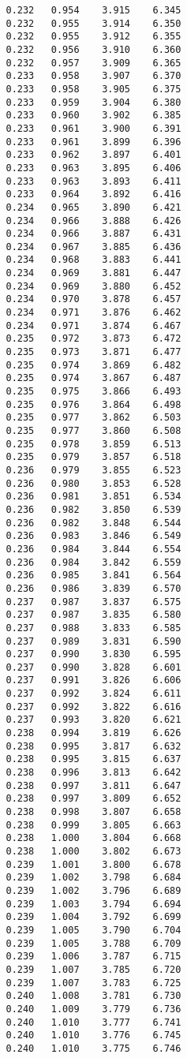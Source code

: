 \begin{verbatim}
   0.232   0.954    3.915    6.345
   0.232   0.955    3.914    6.350
   0.232   0.955    3.912    6.355
   0.232   0.956    3.910    6.360
   0.232   0.957    3.909    6.365
   0.233   0.958    3.907    6.370
   0.233   0.958    3.905    6.375
   0.233   0.959    3.904    6.380
   0.233   0.960    3.902    6.385
   0.233   0.961    3.900    6.391
   0.233   0.961    3.899    6.396
   0.233   0.962    3.897    6.401
   0.233   0.963    3.895    6.406
   0.233   0.963    3.893    6.411
   0.233   0.964    3.892    6.416
   0.234   0.965    3.890    6.421
   0.234   0.966    3.888    6.426
   0.234   0.966    3.887    6.431
   0.234   0.967    3.885    6.436
   0.234   0.968    3.883    6.441
   0.234   0.969    3.881    6.447
   0.234   0.969    3.880    6.452
   0.234   0.970    3.878    6.457
   0.234   0.971    3.876    6.462
   0.234   0.971    3.874    6.467
   0.235   0.972    3.873    6.472
   0.235   0.973    3.871    6.477
   0.235   0.974    3.869    6.482
   0.235   0.974    3.867    6.487
   0.235   0.975    3.866    6.493
   0.235   0.976    3.864    6.498
   0.235   0.977    3.862    6.503
   0.235   0.977    3.860    6.508
   0.235   0.978    3.859    6.513
   0.235   0.979    3.857    6.518
   0.236   0.979    3.855    6.523
   0.236   0.980    3.853    6.528
   0.236   0.981    3.851    6.534
   0.236   0.982    3.850    6.539
   0.236   0.982    3.848    6.544
   0.236   0.983    3.846    6.549
   0.236   0.984    3.844    6.554
   0.236   0.984    3.842    6.559
   0.236   0.985    3.841    6.564
   0.236   0.986    3.839    6.570
   0.237   0.987    3.837    6.575
   0.237   0.987    3.835    6.580
   0.237   0.988    3.833    6.585
   0.237   0.989    3.831    6.590
   0.237   0.990    3.830    6.595
   0.237   0.990    3.828    6.601
   0.237   0.991    3.826    6.606
   0.237   0.992    3.824    6.611
   0.237   0.992    3.822    6.616
   0.237   0.993    3.820    6.621
   0.238   0.994    3.819    6.626
   0.238   0.995    3.817    6.632
   0.238   0.995    3.815    6.637
   0.238   0.996    3.813    6.642
   0.238   0.997    3.811    6.647
   0.238   0.997    3.809    6.652
   0.238   0.998    3.807    6.658
   0.238   0.999    3.805    6.663
   0.238   1.000    3.804    6.668
   0.238   1.000    3.802    6.673
   0.239   1.001    3.800    6.678
   0.239   1.002    3.798    6.684
   0.239   1.002    3.796    6.689
   0.239   1.003    3.794    6.694
   0.239   1.004    3.792    6.699
   0.239   1.005    3.790    6.704
   0.239   1.005    3.788    6.709
   0.239   1.006    3.787    6.715
   0.239   1.007    3.785    6.720
   0.239   1.007    3.783    6.725
   0.240   1.008    3.781    6.730
   0.240   1.009    3.779    6.736
   0.240   1.010    3.777    6.741
   0.240   1.010    3.776    6.745
   0.240   1.010    3.775    6.746
\end{verbatim}
